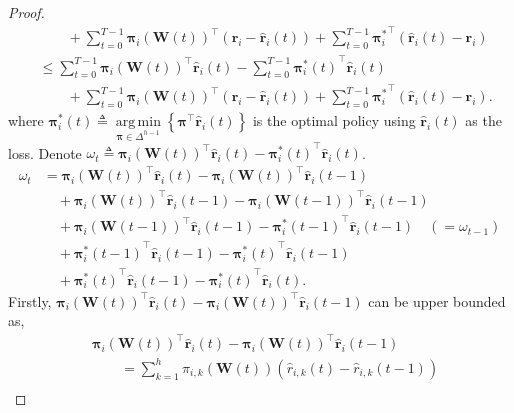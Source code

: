 \documentclass[10pt]{article}
\def\rvr{{\mathbf{r}}}
\def\rvpi{{\boldsymbol{\pi}}}
\def\rmW{{\mathbf{W}}}
\DeclareMathOperator*{\argmin}{arg\,min}
\begin{document}
\begin{proof}
\begin{equation}
\begin{split}
    &\qquad + \sum\limits_{t=0}^{T-1}{ \rvpi_i\left(\rmW(t)\right)^\top \left( \rvr_i - \hat{\rvr}_i(t) \right) } + \sum\limits_{t=0}^{T-1}{ {\rvpi_i^*}^\top \left( \hat{\rvr}_i(t) - \rvr_i \right) } \\
    &\le \sum\limits_{t=0}^{T-1}{ \rvpi_i\left(\rmW(t)\right)^\top \hat{\rvr}_i(t)} - \sum\limits_{t=0}^{T-1}{ {\rvpi_i^*(t)}^\top \hat{\rvr}_i(t)} \\
    &\qquad + \sum\limits_{t=0}^{T-1}{ \rvpi_i\left(\rmW(t)\right)^\top \left( \rvr_i - \hat{\rvr}_i(t) \right) } + \sum\limits_{t=0}^{T-1}{ {\rvpi_i^*}^\top \left( \hat{\rvr}_i(t) - \rvr_i \right) }.
\end{split}
\end{equation}
where ${\rvpi_i^*(t)} \triangleq \argmin\limits_{\rvpi \in \Delta^{h-1}}{ \left\{ \rvpi^\top \hat{\rvr}_i(t) \right\} }$ is the optimal policy using $\hat{\rvr}_i(t)$ as the loss. Denote $\omega_t \triangleq \rvpi_i\left(\rmW(t)\right)^\top \hat{\rvr}_i(t) - {\rvpi_i^*(t)}^\top \hat{\rvr}_i(t)$.
\begin{equation}
\label{eq:dynamic_regret_decomposition}
\begin{split}
    \omega_t &= \rvpi_i\left(\rmW(t)\right)^\top \hat{\rvr}_i(t) - \rvpi_i\left(\rmW(t)\right)^\top \hat{\rvr}_i(t-1) \\
    &\quad + \rvpi_i\left(\rmW(t)\right)^\top \hat{\rvr}_i(t-1) - \rvpi_i\left(\rmW(t-1)\right)^\top \hat{\rvr}_i(t-1) \\
    &\quad + \rvpi_i\left(\rmW(t-1)\right)^\top \hat{\rvr}_i(t-1) - {\rvpi_i^*(t-1)}^\top \hat{\rvr}_i(t-1) \quad \left( = \omega_{t-1} \right) \\
    &\quad + {\rvpi_i^*(t-1)}^\top \hat{\rvr}_i(t-1) - {\rvpi_i^*(t)}^\top \hat{\rvr}_i(t-1) \\
    &\quad + {\rvpi_i^*(t)}^\top \hat{\rvr}_i(t-1) - {\rvpi_i^*(t)}^\top \hat{\rvr}_i(t).
\end{split}
\end{equation}
Firstly, $\rvpi_i\left(\rmW(t)\right)^\top \hat{\rvr}_i(t) - \rvpi_i\left(\rmW(t)\right)^\top \hat{\rvr}_i(t-1)$ can be upper bounded as,
\begin{equation}
\label{eq:first_term_upper_bound}
\begin{split}
    &\rvpi_i\left(\rmW(t)\right)^\top \hat{\rvr}_i(t) - \rvpi_i\left(\rmW(t)\right)^\top \hat{\rvr}_i(t-1) \\
    &\qquad = \sum\limits_{k=1}^{h}{ \pi_{i,k}\left(\rmW(t)\right) \left( \hat{r}_{i,k}(t) - \hat{r}_{i,k}(t-1) \right) } \\

\end{split}
\end{equation}
\end{proof}
\end{document}
